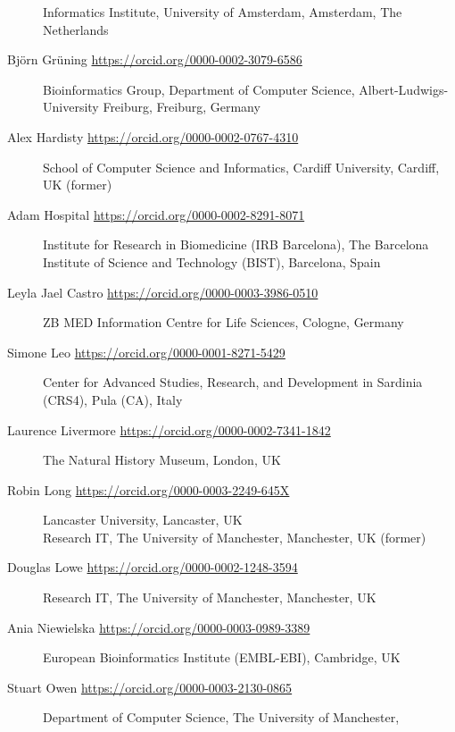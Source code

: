 \begin{description}
Informatics Institute, University of Amsterdam, Amsterdam, The
Netherlands
\item[Björn Grüning \url{https://orcid.org/0000-0002-3079-6586}]
Bioinformatics Group, Department of Computer Science,
Albert-Ludwigs-University Freiburg, Freiburg, Germany
\item[Alex Hardisty \url{https://orcid.org/0000-0002-0767-4310}]
School of Computer Science and Informatics, Cardiff University, Cardiff,
UK (former)
\item[Adam Hospital \url{https://orcid.org/0000-0002-8291-8071}]
Institute for Research in Biomedicine (IRB Barcelona), The Barcelona
Institute of Science and Technology (BIST), Barcelona, Spain
\item[Leyla Jael Castro \url{https://orcid.org/0000-0003-3986-0510}]
ZB MED Information Centre for Life Sciences, Cologne, Germany
\item[Simone Leo \url{https://orcid.org/0000-0001-8271-5429}]
Center for Advanced Studies, Research, and Development in Sardinia
(CRS4), Pula (CA), Italy
\item[Laurence Livermore \url{https://orcid.org/0000-0002-7341-1842}]
The Natural History Museum, London, UK
\item[Robin Long \url{https://orcid.org/0000-0003-2249-645X}]
Lancaster University, Lancaster, UK\\
Research IT, The University of Manchester, Manchester, UK (former)
\item[Douglas Lowe \url{https://orcid.org/0000-0002-1248-3594}]
Research IT, The University of Manchester, Manchester, UK
\item[Ania Niewielska \url{https://orcid.org/0000-0003-0989-3389}]
European Bioinformatics Institute (EMBL-EBI), Cambridge, UK
\item[Stuart Owen \url{https://orcid.org/0000-0003-2130-0865}]
Department of Computer Science, The University of Manchester,

\end{description}
